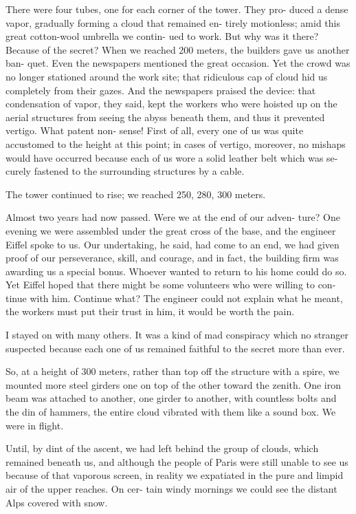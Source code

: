 \documentclass[12pt]{article}
\begin{document}
There were four tubes, one for each corner of the tower. They pro-
duced a dense vapor, gradually forming a cloud that remained en-
tirely motionless; amid this great cotton-wool umbrella we contin-
ued to work. But why was it there? Because of the secret?
When we reached 200 meters, the builders gave us another ban-
quet. Even the newspapers mentioned the great occasion. Yet the
crowd was no longer stationed around the work site; that ridiculous
cap of cloud hid us completely from their gazes. And the newspapers
praised the device: that condensation of vapor, they said, kept the
workers who were hoisted up on the aerial structures from seeing the
abyss beneath them, and thus it prevented vertigo. What patent non-
sense! First of all, every one of us was quite accustomed to the height
at this point; in cases of vertigo, moreover, no mishaps would have
occurred because each of us wore a solid leather belt which was se-
curely fastened to the surrounding structures by a cable.

The tower continued to rise; we reached 250, 280, 300 meters.

Almost two years had now passed. Were we at the end of our adven-
ture? One evening we were assembled under the great cross of the
base, and the engineer Eiffel spoke to us. Our undertaking, he said,
had come to an end, we had given proof of our perseverance, skill,
and courage, and in fact, the building firm was awarding us a special
bonus. Whoever wanted to return to his home could do so. Yet Eiffel
hoped that there might be some volunteers who were willing to con-
tinue with him. Continue what? The engineer could not explain what
he meant, the workers must put their trust in him, it would be worth
the pain.

I stayed on with many others. It was a kind of mad conspiracy
which no stranger suspected because each one of us remained faithful
to the secret more than ever.

So, at a height of 300 meters, rather than top off the structure
with a spire, we mounted more steel girders one on top of the other
toward the zenith. One iron beam was attached to another, one girder
to another, with countless bolts and the din of hammers, the entire
cloud vibrated with them like a sound box. We were in flight.

Until, by dint of the ascent, we had left behind the group of
clouds, which remained beneath us, and although the people of Paris
were still unable to see us because of that vaporous screen, in reality
we expatiated in the pure and limpid air of the upper reaches. On cer-
tain windy mornings we could see the distant Alps covered with
snow.
\end{document}
